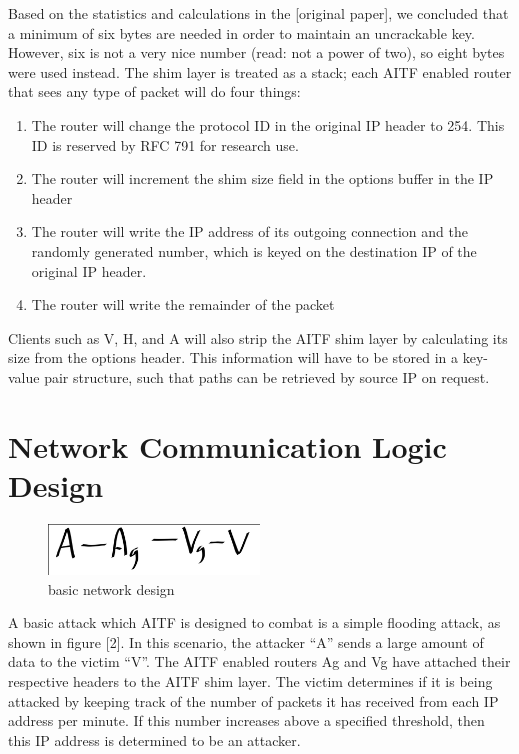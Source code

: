 \documentclass[11pt]{article}
\begin{document}
Based on the statistics and calculations in the [original paper], we concluded that a minimum of six bytes are needed in order to maintain an uncrackable key. However, six is not a very nice number (read: not a power of two), so eight bytes were used instead. The shim layer is treated as a stack; each AITF enabled router that sees any type of packet will do four things: 
\begin{enumerate}
	\item The router will change the protocol ID in the original IP header to 254. This ID is reserved by RFC 791 for research use.
	\item The router will increment the shim size field in the options buffer in the IP header
	\item The router will write the IP address of its outgoing connection and the randomly generated number, which is keyed on the destination IP of the original IP header.
	\item The router will write the remainder of the packet
\end{enumerate}
Clients such as V, H, and A will also strip the AITF shim layer by calculating its size from the options header. This information will have to be stored in a key-value pair structure, such that paths can be retrieved by source IP on request.


\section{Network Communication Logic Design}
\begin{figure}[h!]
  \caption{basic network design}
  \centering
    \includegraphics[width=0.5\textwidth]{basic}
\end{figure}
A basic attack which AITF is designed to combat is a simple flooding attack, as shown in figure [2]. In this scenario, the attacker “A” sends a large amount of data to the victim “V”. The AITF enabled routers Ag and Vg have attached their respective headers to the AITF shim layer. The victim determines if it is being attacked by keeping track of the number of packets it has received from each IP address per minute. If this number increases above a specified threshold, then this IP address is determined to be an attacker. 
\end{document}
